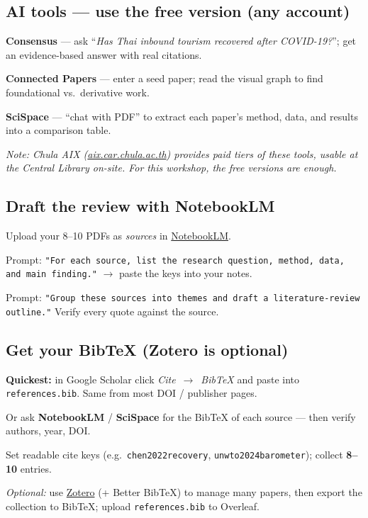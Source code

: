 \documentclass[11pt]{article}
\begin{document}
\subsection*{AI tools --- use the free version (any account)}
\begin{checklist}
\item \textbf{Consensus} --- ask ``\emph{Has Thai inbound tourism recovered after COVID-19?}''; get an evidence-based answer with real citations.
\item \textbf{Connected Papers} --- enter a seed paper; read the visual graph to find foundational vs.\ derivative work.
\item \textbf{SciSpace} --- ``chat with PDF'' to extract each paper's method, data, and results into a comparison table.
\end{checklist}
{\small\emph{Note: Chula AIX (\href{https://aix.car.chula.ac.th/?product_cat=subscribed-ai-tools}{aix.car.chula.ac.th}) provides paid tiers of these tools, usable at the Central Library on-site. For this workshop, the free versions are enough.}}

\subsection*{Draft the review with NotebookLM}
\begin{checklist}
\item Upload your 8--10 PDFs as \emph{sources} in \href{https://notebooklm.google.com}{NotebookLM}.
\item Prompt: \texttt{"For each source, list the research question, method, data, and main finding."} $\rightarrow$ paste the keys into your notes.
\item Prompt: \texttt{"Group these sources into themes and draft a literature-review outline."} Verify every quote against the source.
\end{checklist}

\subsection*{Get your BibTeX (Zotero is optional)}
\begin{checklist}
\item \textbf{Quickest:} in Google Scholar click \emph{Cite}~$\rightarrow$~\emph{BibTeX} and paste into \texttt{references.bib}. Same from most DOI / publisher pages.
\item Or ask \textbf{NotebookLM} / \textbf{SciSpace} for the BibTeX of each source --- then verify authors, year, DOI.
\item Set readable cite keys (e.g.\ \texttt{chen2022recovery}, \texttt{unwto2024barometer}); collect \textbf{8--10} entries.
\item \emph{Optional:} use \href{https://www.zotero.org}{Zotero} (+ Better BibTeX) to manage many papers, then export the collection to BibTeX; upload \texttt{references.bib} to Overleaf.
\end{checklist}
\end{document}
